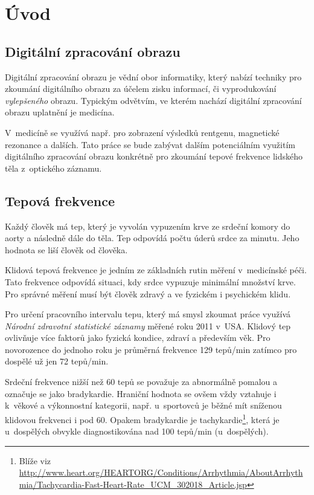 \documentclass[
  digital, %
  table,   %
%
  lof,     %
  lot,     %
]{fithesis3}
\begin{document}
\chapter{Úvod}
\section{Digitální zpracování obrazu}
Digitální zpracování obrazu je vědní obor informatiky, který nabízí techniky pro zkoumání digitálního obrazu za účelem zisku informací, či vyprodukování \emph{vylepšeného} obrazu. Typickým odvětvím, ve kterém nachází digitální zpracování obrazu uplatnění je medicína. 

V~medicíně se využívá např. pro zobrazení výsledků rentgenu, magnetické rezonance a dalších. Tato práce se bude zabývat dalším potenciálním využitím digitálního zpracování obrazu konkrétně pro zkoumání tepové frekvence lidského těla z~optického záznamu. 

\section{Tepová frekvence}
Každý člověk má tep, který je vyvolán vypuzením krve ze srdeční komory do aorty a následně dále do těla. Tep odpovídá počtu úderů srdce za minutu. Jeho hodnota se liší člověk od člověka. 

Klidová tepová frekvence je jedním ze základních rutin měření v~medicínské péči. Tato frekvence odpovídá situaci, kdy srdce vypuzuje minimální množství krve. Pro správné měření musí být člověk zdravý a ve fyzickém i psychickém klidu.

Pro určení pracovního intervalu tepu, který má smysl zkoumat práce využívá \emph{Národní zdravotní statistické záznamy} \cite{national-health-statistics-reports} měřené roku 2011 v~USA. Klidový tep ovlivňuje více faktorů jako fyzická kondice, zdraví a především věk. Pro novorozence do jednoho roku je průměrná frekvence 129 tepů/min zatímco pro dospělé už jen 72 tepů/min.

Srdeční frekvence nižší než 60 tepů se považuje za abnormálně pomalou a označuje se jako bradykardie. Hraniční hodnota se ovšem vždy vztahuje i k~věkové a výkonnostní kategorii, např. u~sportovců je běžné mít sníženou klidovou frekvenci i pod 60. Opakem bradykardie je tachykardie\footnote{Blíže viz \url{http://www.heart.org/HEARTORG/Conditions/Arrhythmia/AboutArrhythmia/Tachycardia-Fast-Heart-Rate_UCM_302018_Article.jsp}}, která je u~dospělých obvykle diagnostikována nad 100 tepů/min (u~dospělých).
\end{document}

